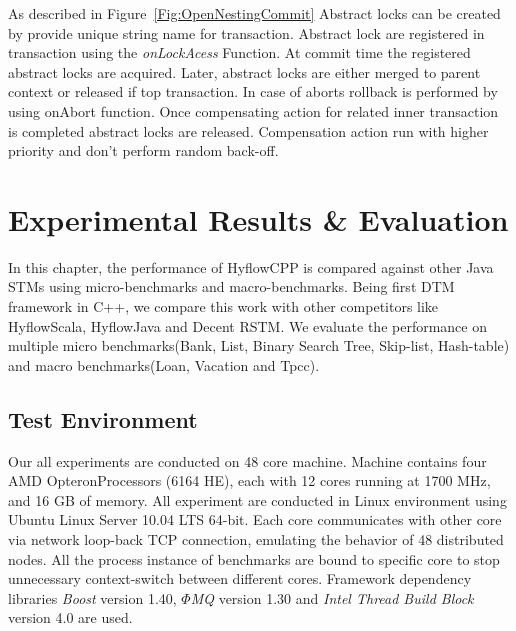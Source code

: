 \documentclass[12pt,english]{report}
\begin{document}
As described in Figure~\ref{Fig:OpenNestingCommit} Abstract locks can be created by provide unique string name for transaction. Abstract lock are registered in transaction using the \textit{onLockAcess} Function. At commit time the registered abstract locks are acquired. Later, abstract locks are either merged to parent context or released if top transaction. In case of aborts rollback is performed by using onAbort function. Once compensating action for related inner transaction is completed abstract locks are released. Compensation action run with higher priority and don't perform random back-off.   


\chapter{Experimental Results \& Evaluation}\label{chap:expResults}

In this chapter, the performance of HyflowCPP is compared against other Java STMs using micro-benchmarks and macro-benchmarks. Being first DTM framework in C++, we compare this work with other competitors like HyflowScala, HyflowJava and Decent RSTM. We evaluate the performance on multiple micro benchmarks(Bank, List, Binary Search Tree, Skip-list, Hash-table) and  macro benchmarks(Loan, Vacation and Tpcc).   

\section{Test Environment}

Our all experiments are conducted on 48 core machine. Machine contains four AMD Opteron\texttrademark  Processors (6164 HE), each with 12 cores running at 1700 MHz, and 16 GB of memory. All experiment are conducted in Linux environment using Ubuntu Linux Server 10.04 LTS 64-bit.  Each core communicates with other core via network loop-back TCP connection, emulating the behavior of 48 distributed nodes. All the process instance of benchmarks are bound to specific core to stop unnecessary context-switch between different cores. Framework dependency libraries \textit{Boost} version 1.40, \textit{$\Phi$MQ} version 1.30 and \textit{Intel Thread Build Block} version 4.0 are used.  
\end{document}
